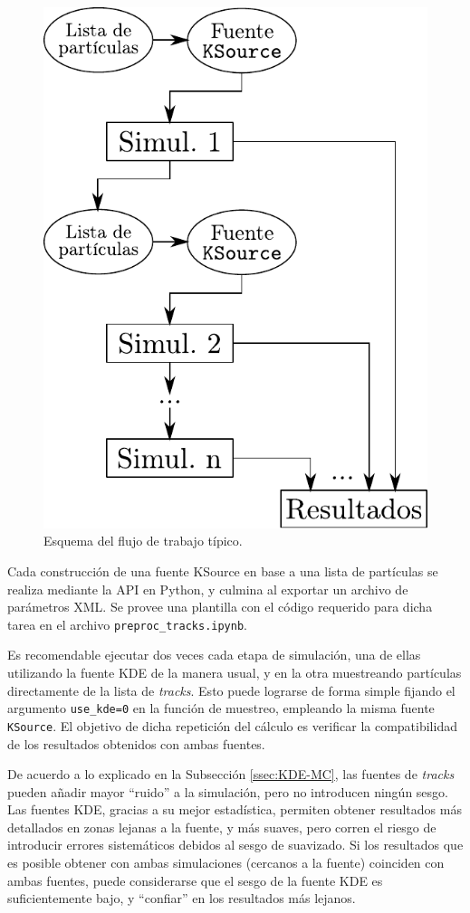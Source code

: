 \begin{figure}[b!]
	\centering
	\includegraphics[width=.7\textwidth]{figs/flujo_trabajo.pdf}
	\caption{Esquema del flujo de trabajo típico.}
	\label{fig:flujo}
\end{figure}

Cada construcción de una fuente KSource en base a una lista de partículas se realiza mediante la API en Python, y culmina al exportar un archivo de parámetros XML. Se provee una plantilla con el código requerido para dicha tarea en el archivo \verb|preproc_tracks.ipynb|.

Es recomendable ejecutar dos veces cada etapa de simulación, una de ellas utilizando la fuente KDE de la manera usual, y en la otra muestreando partículas directamente de la lista de \emph{tracks}. Esto puede lograrse de forma simple fijando el argumento \verb|use_kde=0| en la función de muestreo, empleando la misma fuente \verb|KSource|. El objetivo de dicha repetición del cálculo es verificar la compatibilidad de los resultados obtenidos con ambas fuentes.

De acuerdo a lo explicado en la Subsección \ref{ssec:KDE-MC}, las fuentes de \emph{tracks} pueden añadir mayor ``ruido'' a la simulación, pero no introducen ningún sesgo. Las fuentes KDE, gracias a su mejor estadística, permiten obtener resultados más detallados en zonas lejanas a la fuente, y más suaves, pero corren el riesgo de introducir errores sistemáticos debidos al sesgo de suavizado. Si los resultados que es posible obtener con ambas simulaciones (cercanos a la fuente) coinciden con ambas fuentes, puede considerarse que el sesgo de la fuente KDE es suficientemente bajo, y ``confiar'' en los resultados más lejanos.


